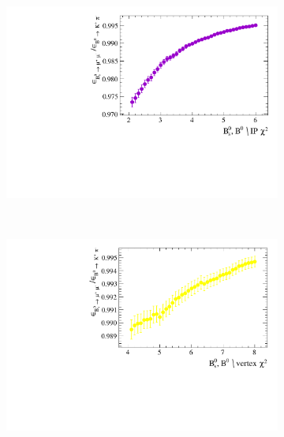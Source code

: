 \begin{figure}[htbp]
    \centering
    \begin{subfigure}[b]{0.4\textwidth}
        \includegraphics[width=\textwidth]{./Figs/Selection/Bs2MuMu_KPi_IP.pdf}
    \end{subfigure}
    ~ %
    \begin{subfigure}[b]{0.4\textwidth}
        \includegraphics[width=\textwidth]{./Figs/Selection/BSMuMu_KPi_vertex.pdf}
    \end{subfigure}
    ~ %


\end{figure}
